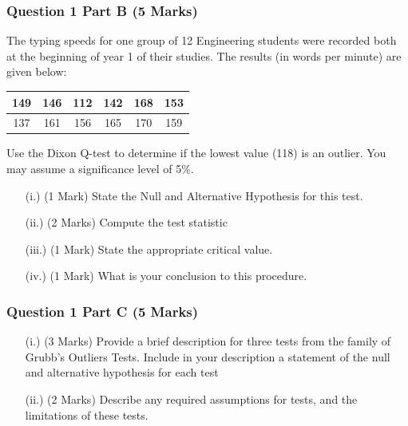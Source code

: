 \documentclass[a4paper,12pt]{article}
\begin{document}
\subsubsection*{Question 1 Part B (5 Marks)}

The typing speeds for one group of 12 Engineering students were recorded both at the beginning of year 1 of their studies. The results (in words per minute) are given below:

\begin{center}
	\begin{tabular}{|c|c|c|c|c|c|}
		\hline
		149  & 146 & 112 & 142 & 168& 153\\ \hline
		137 & 161 & 156& 165&  170&  159
		\\ \hline
	\end{tabular}
\end{center}
Use the Dixon Q-test to determine if the lowest value (118) is an outlier. You may assume a significance level of 5\%.
\begin{itemize}
	\item[(i.)](1 Mark)	State the Null and Alternative Hypothesis for this test.
	\item[(ii.)](2 Marks) Compute the test statistic
	\item[(iii.)](1 Mark) State the appropriate critical value.
	\item[(iv.)](1 Mark) What is your conclusion to this procedure.
\end{itemize}
\newpage
\subsubsection*{Question 1 Part C (5 Marks)}

\begin{itemize}
	\item[(i.)] (3 Marks) Provide a brief description for three tests from the family of Grubb's  Outliers Tests. Include in your description a statement of the null and alternative hypothesis for each test
	\item[(ii.)] (2 Marks) Describe any required assumptions for tests, and the limitations of these tests.
\end{itemize}
\end{document}
